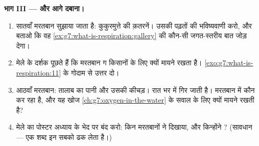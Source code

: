\begin{problem}
\medskip\noindent\textbf{भाग III --- और आगे दबाना।}
\begin{enumerate}[resume]
  \item सातवाँ मरतबान सुझाया जाता है: कुकुरमुत्ते की क़तरनें। उसकी
        पढ़तों की भविष्यवाणी करो, और बताओ कि वह
        \cref{ex:g7:what-is-respiration:gallery} की कौन-सी
        जगत-स्तरीय बात जोड़ देगा।
  \item मेले के दर्शक पूछते हैं कि मरतबान ग किसानों के लिए क्यों मायने
        रखता है। \cref{exo:g7:what-is-respiration:11} के गोदाम से
        उत्तर दो।
  \item आठवाँ मरतबान: तालाब का पानी और उसकी कीचड़। रात भर में 
        गिर जाती है। मरतबान में  कौन कर रहा है, और यह खोज
        \cref{ch:g7:oxygen-in-the-water} के सवाल के लिए क्यों मायने
        रखती है?
  \item मेले का पोस्टर अध्याय के भेद पर बंद करो: किन मरतबानों ने
        \emph{} दिखाया, और किन्होंने \emph{}?
        (सावधान --- एक शब्द इन सबको ढक लेता है।)
\end{enumerate}
\end{problem}

